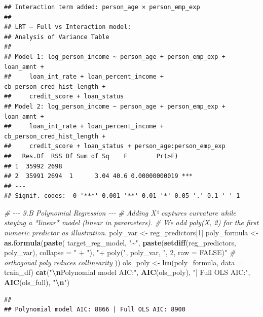 \documentclass[
]{article}
\newenvironment{Shaded}{\begin{snugshade}}{\end{snugshade}}
\newcommand{\AttributeTok}[1]{\textcolor[rgb]{0.13,0.29,0.53}{#1}}
\newcommand{\CommentTok}[1]{\textcolor[rgb]{0.56,0.35,0.01}{\textit{#1}}}
\newcommand{\DecValTok}[1]{\textcolor[rgb]{0.00,0.00,0.81}{#1}}
\newcommand{\FunctionTok}[1]{\textcolor[rgb]{0.13,0.29,0.53}{\textbf{#1}}}
\newcommand{\NormalTok}[1]{#1}
\newcommand{\OtherTok}[1]{\textcolor[rgb]{0.56,0.35,0.01}{#1}}
\newcommand{\SpecialCharTok}[1]{\textcolor[rgb]{0.81,0.36,0.00}{\textbf{#1}}}
\newcommand{\StringTok}[1]{\textcolor[rgb]{0.31,0.60,0.02}{#1}}
\begin{document}
\begin{verbatim}
## Interaction term added: person_age × person_emp_exp 
## 
## LRT — Full vs Interaction model:
## Analysis of Variance Table
## 
## Model 1: log_person_income ~ person_age + person_emp_exp + loan_amnt + 
##     loan_int_rate + loan_percent_income + cb_person_cred_hist_length + 
##     credit_score + loan_status
## Model 2: log_person_income ~ person_age + person_emp_exp + loan_amnt + 
##     loan_int_rate + loan_percent_income + cb_person_cred_hist_length + 
##     credit_score + loan_status + person_age:person_emp_exp
##   Res.Df  RSS Df Sum of Sq    F        Pr(>F)    
## 1  35992 2698                                    
## 2  35991 2694  1      3.04 40.6 0.00000000019 ***
## ---
## Signif. codes:  0 '***' 0.001 '**' 0.01 '*' 0.05 '.' 0.1 ' ' 1
\end{verbatim}

\begin{Shaded}
\begin{Highlighting}[]
\CommentTok{\# {-}{-}{-} 9.B  Polynomial Regression {-}{-}{-}}
\CommentTok{\# Adding X² captures curvature while staying a *linear* model (linear in parameters).}
\CommentTok{\# We add poly(X, 2) for the first numeric predictor as illustration.}
\NormalTok{poly\_var }\OtherTok{\textless{}{-}}\NormalTok{ reg\_predictors[}\DecValTok{1}\NormalTok{]}
\NormalTok{poly\_formula }\OtherTok{\textless{}{-}} \FunctionTok{as.formula}\NormalTok{(}\FunctionTok{paste}\NormalTok{(}
\NormalTok{  target\_reg\_model, }\StringTok{"\textasciitilde{}"}\NormalTok{,}
  \FunctionTok{paste}\NormalTok{(}\FunctionTok{setdiff}\NormalTok{(reg\_predictors, poly\_var), }\AttributeTok{collapse =} \StringTok{" + "}\NormalTok{),}
  \StringTok{"+ poly("}\NormalTok{, poly\_var, }\StringTok{", 2, raw = FALSE)"}   \CommentTok{\# orthogonal poly reduces collinearity}
\NormalTok{))}
\NormalTok{ols\_poly }\OtherTok{\textless{}{-}} \FunctionTok{lm}\NormalTok{(poly\_formula, }\AttributeTok{data =}\NormalTok{ train\_df)}
\FunctionTok{cat}\NormalTok{(}\StringTok{"}\SpecialCharTok{\textbackslash{}n}\StringTok{Polynomial model AIC:"}\NormalTok{, }\FunctionTok{AIC}\NormalTok{(ols\_poly),}
    \StringTok{"| Full OLS AIC:"}\NormalTok{, }\FunctionTok{AIC}\NormalTok{(ols\_full), }\StringTok{"}\SpecialCharTok{\textbackslash{}n}\StringTok{"}\NormalTok{)}
\end{Highlighting}
\end{Shaded}

\begin{verbatim}
## 
## Polynomial model AIC: 8866 | Full OLS AIC: 8900
\end{verbatim}
\end{document}
